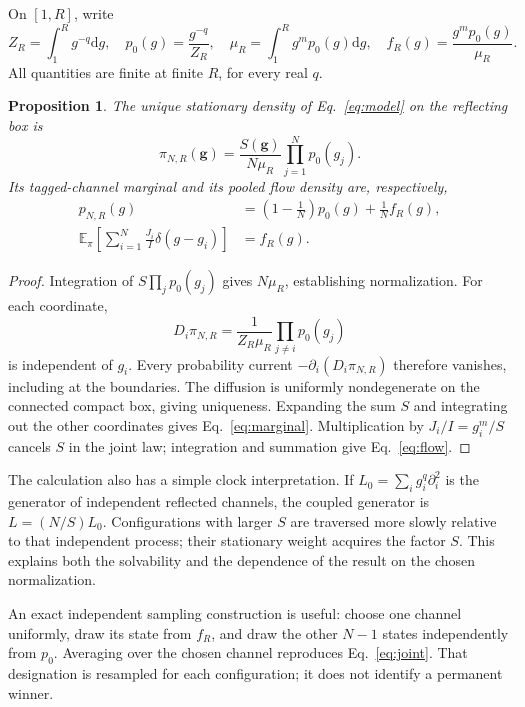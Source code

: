 \documentclass[11pt,a4paper]{article}
\newtheorem{proposition}{Proposition}
\newcommand{\E}{\mathbb{E}}
\newcommand{\dd}{\mathrm{d}}
\begin{document}
On $[1,R]$, write
\begin{equation}
 Z_R=\int_1^R g^{-q}\dd g,\quad p_0(g)=\frac{g^{-q}}{Z_R},\quad
 \mu_R=\int_1^R g^m p_0(g)\dd g,\quad
 f_R(g)=\frac{g^m p_0(g)}{\mu_R}.
 \label{eq:base}
\end{equation}
All quantities are finite at finite $R$, for every real $q$.

\begin{proposition}
The unique stationary density of Eq.~\eqref{eq:model} on the reflecting box is
\begin{equation}
 \pi_{N,R}(\mathbf g)=\frac{S(\mathbf g)}{N\mu_R}
                 \prod_{j=1}^N p_0(g_j).
 \label{eq:joint}
\end{equation}
Its tagged-channel marginal and its pooled flow density are, respectively,
\begin{align}
 p_{N,R}(g)&=\left(1-\frac1N\right)p_0(g)+\frac1N f_R(g),
 \label{eq:marginal}\\
 \E_{\pi}\!\left[\sum_{i=1}^N\frac{J_i}{I}\delta(g-g_i)\right]&=f_R(g).
 \label{eq:flow}
\end{align}
\end{proposition}

\begin{proof}
Integration of $S\prod_j p_0(g_j)$ gives $N\mu_R$, establishing normalization.
For each coordinate,
\[
 D_i\pi_{N,R}=\frac{1}{Z_R\mu_R}\prod_{j\ne i}p_0(g_j)
\]
is independent of $g_i$. Every probability current
$-\partial_i(D_i\pi_{N,R})$ therefore vanishes, including at the boundaries.
The diffusion is uniformly nondegenerate on the connected compact box, giving
uniqueness. Expanding the sum $S$ and integrating out the other coordinates
gives Eq.~\eqref{eq:marginal}. Multiplication by $J_i/I=g_i^m/S$ cancels $S$
in the joint law; integration and summation give Eq.~\eqref{eq:flow}.
\end{proof}

The calculation also has a simple clock interpretation. If
$L_0=\sum_i g_i^q\partial_i^2$ is the generator of independent reflected
channels, the coupled generator is $L=(N/S)L_0$. Configurations with larger
$S$ are traversed more slowly relative to that independent process; their
stationary weight acquires the factor $S$. This explains both the solvability
and the dependence of the result on the chosen normalization.

An exact independent sampling construction is useful: choose one channel
uniformly, draw its state from $f_R$, and draw the other $N-1$ states independently
from $p_0$. Averaging over the chosen channel reproduces Eq.~\eqref{eq:joint}.
That designation is resampled for each configuration; it does not identify a
permanent winner.
\end{document}
